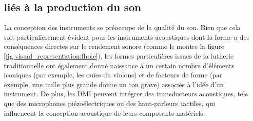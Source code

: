 \subsection{liés à la production du son}

La conception des instruments se préoccupe de la qualité du son. Bien que cela soit particulièrement évident pour les instruments acoustiques dont la forme a des conséquences directes sur le rendement sonore (comme le montre la figure \ref{fig:visual_representation:fhole}), les formes particulières issues de la lutherie traditionnelle ont également donné naissance à un certain nombre d'éléments iconiques (par exemple, les ouïes du violons) et de facteurs de forme (par exemple, une taille plus grande donne un ton grave) associés à l'idée d'un instrument. De plus, les DMI peuvent intégrer des transducteurs acoustiques, tels que des microphones piézoélectriques ou des haut-parleurs tactiles, qui influencent la conception acoustique de leurs composants matériels.


